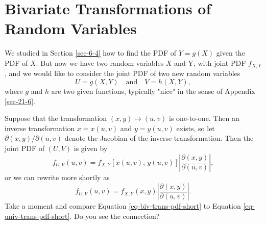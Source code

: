 \section{Bivariate Transformations of Random Variables}
\label{sec-7-7}

We studied in Section \ref{sec-6-4} how to find the PDF
of \(Y=g(X)\) given the PDF of \(X\). But now we have two random
variables \(X\) and Y, with joint PDF \(f_{X,Y}\), and we would like
to consider the joint PDF of two new random variables
\begin{equation}
U=g(X,Y)\quad \mbox{and}\quad V=h(X,Y),
\end{equation}
where \(g\) and \(h\) are two given functions, typically "nice" in
the sense of Appendix \ref{sec-21-6}.

Suppose that the transformation \((x,y)\longmapsto(u,v)\) is
one-to-one. Then an inverse transformation \(x=x(u,v)\) and
\(y=y(u,v)\) exists, so let \(\partial(x,y)/\partial(u,v)\) denote the
Jacobian of the inverse transformation. Then the joint PDF of
\((U,V)\) is given by
\begin{equation}
f_{U,V}(u,v)=f_{X,Y}\left[x(u,v),\, y(u,v)\right]\left|\frac{\partial(x,y)}{\partial(u,v)}\right|,
\end{equation}
or we can rewrite more shortly as
\begin{equation}
\label{eq-biv-trans-pdf-short}
f_{U,V}(u,v)=f_{X,Y}(x,y)\left|\frac{\partial(x,y)}{\partial(u,v)}\right|.
\end{equation}
Take a moment and compare Equation \eqref{eq-biv-trans-pdf-short} to Equation
\eqref{eq-univ-trans-pdf-short}. Do you see the connection?

